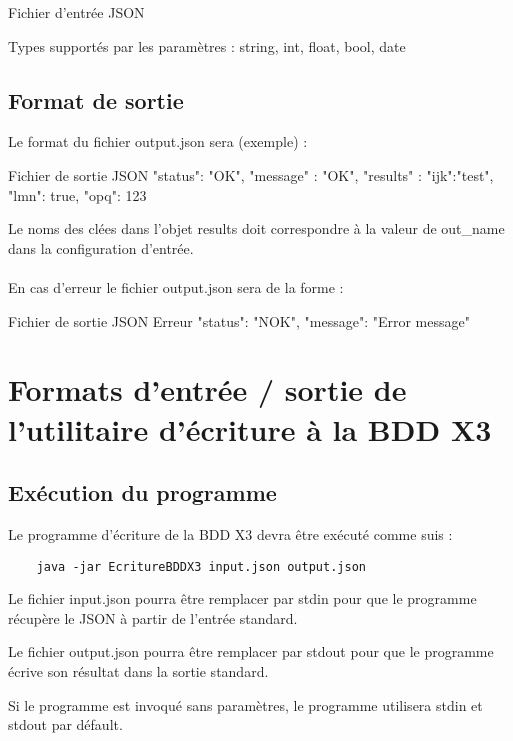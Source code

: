 {\begin{Python}{Fichier d'entrée JSON}
\end{Python}

Types supportés par les paramètres : string, int, float, bool, date

\subsection{Format de sortie}

Le format du fichier output.json sera (exemple) :

\begin{Python}{Fichier de sortie JSON}
    {
        "status": "OK",
        "message" : "OK",
        "results" : {
            "ijk":"test",
            "lmn": true,
            "opq": 123   
        }
    }
\end{Python}

Le noms des clées dans l'objet results doit correspondre à la valeur de out\_name dans la configuration d'entrée.
\\ \\
En cas d’erreur le fichier output.json sera de la forme :

\begin{Python}{Fichier de sortie JSON Erreur}
    {
        "status": "NOK",
        "message": "Error message"
    }
\end{Python}


\section{Formats d'entrée / sortie de l'utilitaire d'écriture à la BDD X3}

\subsection{Exécution du programme}

Le programme d’écriture de la BDD X3 devra être exécuté comme suis :

\begin{verbatim}
    java -jar EcritureBDDX3 input.json output.json
\end{verbatim}

Le fichier input.json pourra être remplacer par stdin pour que le programme récupère le JSON à partir de l’entrée standard.

Le fichier output.json pourra être remplacer par stdout pour que le programme écrive son résultat dans la sortie standard.

Si le programme est invoqué sans paramètres, le programme utilisera stdin et stdout par défault.

}
